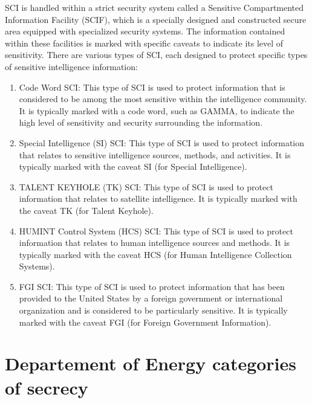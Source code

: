 SCI is handled within a strict security system called a Sensitive Compartmented Information Facility (SCIF), which is a specially designed and constructed secure area equipped with specialized security systems. The information contained within these facilities is marked with specific caveats to indicate its level of sensitivity. There are various types of SCI, each designed to protect specific types of sensitive intelligence information:
\begin{enumerate}
\item
Code Word SCI: This type of SCI is used to protect information that is considered to be among the most sensitive within the intelligence community. It is typically marked with a code word, such as GAMMA, to indicate the high level of sensitivity and security surrounding the information.

\item
Special Intelligence (SI) SCI: This type of SCI is used to protect information that relates to sensitive intelligence sources, methods, and activities. It is typically marked with the caveat SI (for Special Intelligence).

\item
TALENT KEYHOLE (TK) SCI: This type of SCI is used to protect information that relates to satellite intelligence. It is typically marked with the caveat TK (for Talent Keyhole).

\item
HUMINT Control System (HCS) SCI: This type of SCI is used to protect information that relates to human intelligence sources and methods. It is typically marked with the caveat HCS (for Human Intelligence Collection Systems).

\item
FGI SCI: This type of SCI is used to protect information that has been provided to the United States by a foreign government or international organization and is considered to be particularly sensitive. It is typically marked with the caveat FGI (for Foreign Government Information).
\end{enumerate}

\section{Departement of Energy categories of secrecy}
\label{2023-UFO-part-Perception-crash-retreivals-DOECOS}


